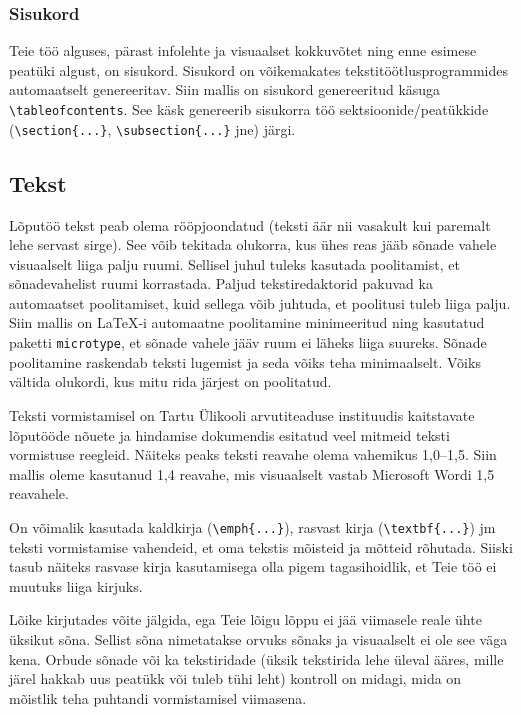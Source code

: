 \subsubsection{Sisukord}
Teie töö alguses, pärast infolehte ja visuaalset kokkuvõtet ning enne esimese peatüki algust, on sisukord. Sisukord on võikemakates tekstitöötlusprogrammides automaatselt genereeritav. Siin mallis on sisukord genereeritud käsuga \verb|\tableofcontents|. See käsk genereerib sisukorra töö sektsioonide/peatükkide (\verb|\section{...}|, \verb|\subsection{...}| jne) järgi.

\subsection{Tekst}
Lõputöö tekst peab olema rööpjoondatud (teksti äär nii vasakult kui paremalt lehe servast sirge). See võib tekitada olukorra, kus ühes reas jääb sõnade vahele visuaalselt liiga palju ruumi. Sellisel juhul tuleks kasutada poolitamist, et sõnadevahelist ruumi korrastada. Paljud tekstiredaktorid pakuvad ka automaatset poolitamiset, kuid sellega võib juhtuda, et poolitusi tuleb liiga palju. Siin mallis on LaTeX-i automaatne poolitamine minimeeritud ning kasutatud paketti \verb|microtype|, et sõnade vahele jääv ruum ei läheks liiga suureks. Sõnade poolitamine raskendab teksti lugemist ja seda võiks teha minimaalselt. Võiks vältida olukordi, kus mitu rida järjest on poolitatud.

Teksti vormistamisel on Tartu Ülikooli arvutiteaduse instituudis kaitstavate lõputööde nõuete ja hindamise dokumendis esitatud veel mitmeid teksti vormistuse reegleid. Näiteks peaks teksti reavahe olema vahemikus 1,0–1,5. Siin mallis oleme kasutanud 1,4 reavahe, mis visuaalselt vastab Microsoft Wordi 1,5 reavahele.

On võimalik kasutada kaldkirja (\verb|\emph{...}|), rasvast kirja (\verb|\textbf{...}|) jm teksti vormistamise vahendeid, et oma tekstis mõisteid ja mõtteid rõhutada. Siiski tasub näiteks rasvase kirja kasutamisega olla pigem tagasihoidlik, et Teie töö ei muutuks liiga kirjuks.

Lõike kirjutades võite jälgida, ega Teie lõigu lõppu ei jää viimasele reale ühte üksikut sõna. Sellist sõna nimetatakse orvuks sõnaks ja visuaalselt ei ole see väga kena. Orbude sõnade või ka tekstiridade (üksik tekstirida lehe üleval ääres, mille järel hakkab uus peatükk või tuleb tühi leht) kontroll on midagi, mida on mõistlik teha puhtandi vormistamisel viimasena.

